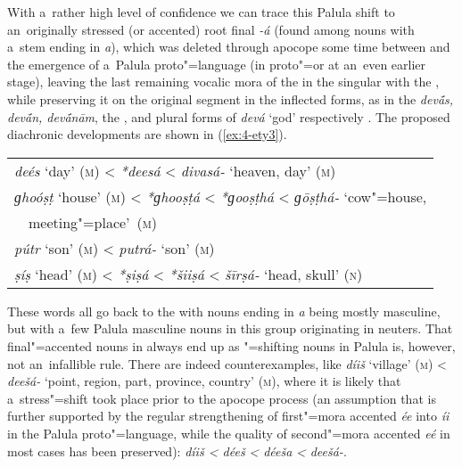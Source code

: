 With a~rather high level of confidence we can trace this Palula  shift to an~originally stressed (or accented) root final \textit{-á} (found among \iliOIA nouns with a~stem ending in \textit{a}), which was deleted through apocope some time between \iliMIA \citep[247--248]{pischel2011} and the emergence of a~Palula proto"=language (in proto"=\iliShina or at an~even earlier stage), leaving the last remaining vocalic mora of the  in the  singular with the , while preserving it on the original segment in the inflected  forms, as in the \iliOIA \textit{dev\'{\={a}}s, dev\'{\={a}}n, dev\'{\={a}}nām}, the ,  and  plural forms of \textit{devá} `god' respectively \citep[330]{whitney1960}. The proposed diachronic developments are shown in (\ref{ex:4-ety3}). 

\begin{exe}
\extab
\label{ex:4-ety3}
\begin{tabular}{ l }
\textit{deés} `day' (\textsc{m}) {\textless} \textit{*deesá} {\textless} \textit{divasá-} `heaven, day' (\textsc{m})\\
\textit{ɡhoóṣṭ} `house' (\textsc{m}) {\textless} \textit{*ɡhooṣṭá} {\textless} \textit{*ɡooṣṭhá} {\textless} \textit{ɡōṣṭhá-} `cow"=house, \\
~~meeting"=place'~(\textsc{m})\\
\textit{pútr} `son' (\textsc{m}) {\textless} \textit{putrá-} `son' (\textsc{m})\\
\textit{ṣíṣ} `head' (\textsc{m}) {\textless} \textit{*ṣiṣá} {\textless} \textit{*šiiṣá} {\textless} \textit{šīrṣá-} `head, skull' (\textsc{n})
\end{tabular}
\end{exe}

These words all go back to the \iliOIA {} with nouns ending in \textit{a} being mostly masculine, but with a~few Palula masculine nouns in this group originating in \iliOIA neuters. That final"=accented nouns in \iliOIA always end up as "=shifting nouns in Palula is, however, not an~infallible rule. There are indeed counterexamples, like \textit{díiš} `village' (\textsc{m}) {\textless} \textit{deešá-} `point, region, part, province, country' (\textsc{m}), where it is likely that a~stress"=shift took place prior to the apocope process (an assumption that is further supported by the regular strengthening of first"=mora accented \textit{ée} into \textit{íi} in the Palula proto"=language, while the quality of second"=mora accented \textit{eé} in most cases has been preserved): \textit{díiš {\textless} déeš} \textit{{\textless} déeša} \textit{{\textless}} \textit{deešá-}. 


